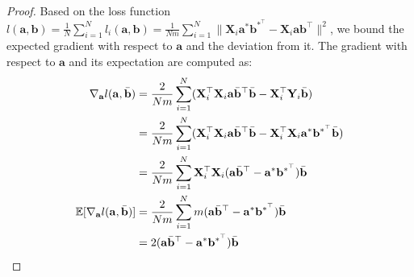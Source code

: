\documentclass{article}
\theoremstyle{plain}
\theoremstyle{definition}
\theoremstyle{remark}
\begin{document}
\begin{proof}
Based on the loss function $l(\mathbf{a},\mathbf{b}) = \frac{1}{N} \sum_{i=1}^{N} l_i(\mathbf{a},\mathbf{b}) = \frac{1}{Nm} \sum_{i=1}^{N} \lVert  \mathbf{X}_i\mathbf{a}^*\mathbf{b}^{*^\top}- \mathbf{X}_i\mathbf{a}\mathbf{b}^\top\rVert^2$, we bound the expected gradient with respect to $\mathbf{a}$ and the deviation from it. The gradient with respect to $\mathbf{a}$ and its expectation are computed as:
\begin{align}
\nabla_{\mathbf{a}}l(\mathbf{a},\Bar{\mathbf{b}}) &= \frac{2}{Nm}\sum_{i=1}^{N}( \mathbf{X}_i^\top\mathbf{X}_i\mathbf{a}\Bar{\mathbf{b}}^\top \Bar{\mathbf{b}}- \mathbf{X}_i^\top\mathbf{Y}_i\Bar{\mathbf{b}} )\\
& =  \frac{2}{Nm}\sum_{i=1}^{N}(\mathbf{X}_i^\top\mathbf{X}_i\mathbf{a}\Bar{\mathbf{b}}^\top \Bar{\mathbf{b}}-\mathbf{X}_i^\top\mathbf{X}_i\mathbf{a}^* \mathbf{b}^{*^\top}\Bar{\mathbf{b}})\\
& = \frac{2}{Nm}\sum_{i=1}^{N} \mathbf{X}_i^\top\mathbf{X}_i (\mathbf{a}\Bar{\mathbf{b}}^\top-\mathbf{a}^* \mathbf{b}^{*^\top}) \Bar{\mathbf{b}} \\
\mathbb{E}[\nabla_{\mathbf{a}}l(\mathbf{a},\Bar{\mathbf{b}})]  &=  \frac{2}{Nm}\sum_{i=1}^{N} m(\mathbf{a}\Bar{\mathbf{b}}^\top-\mathbf{a}^* \mathbf{b}^{*^\top}) \Bar{\mathbf{b}} \\
& = 2(\mathbf{a}\Bar{\mathbf{b}}^\top-\mathbf{a}^* \mathbf{b}^{*^\top}) \Bar{\mathbf{b}} \label{exp-grad}
\end{align}


\end{proof}
\end{document}
